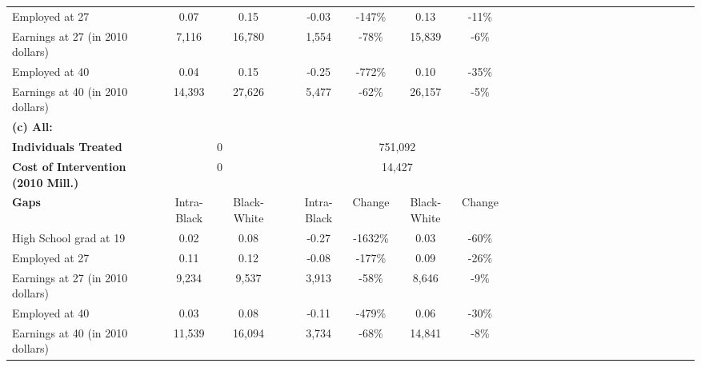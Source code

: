 \begin{table}[htbp]
\begin{center}
\begin{tabular}{lcccccccccccccccccccccccc}
 \\[0.2cm]  
Employed at 27 &        0.07&        0.15&&       -0.03&        -147\% &        0.13&         -11\% &
 \\[0.2cm]  
Earnings at 27 (in 2010 dollars) &       7,116&      16,780&&       1,554&         -78\% &      15,839&          -6\% &
 \\[0.2cm]  
Employed at 40 &        0.04&        0.15&&       -0.25&        -772\% &        0.10&         -35\% &
 \\[0.2cm]  
Earnings at 40 (in 2010 dollars) &      14,393&      27,626&&       5,477&         -62\% &      26,157&          -5\% &
 \\[0.2cm]  
\hline
 \textbf{(c) All:} & \multicolumn{2}{c}{}   &  &\multicolumn{4}{c}{}   \\[0.02cm] 
\textbf{Individuals Treated} &\multicolumn{2}{c}{ 0 } &
 &\multicolumn{4}{c}{     751,092} &
 \\[0.2cm]  
\textbf{Cost of Intervention (2010 Mill.)} &\multicolumn{2}{c}{ 0 } &
 &\multicolumn{4}{c}{      14,427} &
 \\[0.2cm]  
\textbf{Gaps}&Intra-Black &Black-White & &Intra-Black &Change &Black-White &Change  \\[0.02cm] 
\hline
High School grad at 19 &        0.02&        0.08&&       -0.27&       -1632\% &        0.03&         -60\% &
 \\[0.2cm]  
Employed at 27 &        0.11&        0.12&&       -0.08&        -177\% &        0.09&         -26\% &
 \\[0.2cm]  
Earnings at 27 (in 2010 dollars) &       9,234&       9,537&&       3,913&         -58\% &       8,646&          -9\% &
 \\[0.2cm]  
Employed at 40 &        0.03&        0.08&&       -0.11&        -479\% &        0.06&         -30\% &
 \\[0.2cm]  
Earnings at 40 (in 2010 dollars) &      11,539&      16,094&&       3,734&         -68\% &      14,841&          -8\% &
 \\[0.2cm]  
  \hline \hline    \end{tabular}
 \end{center} 
       {\scriptsize  
       {\raggedright 
}}
\end{table}
